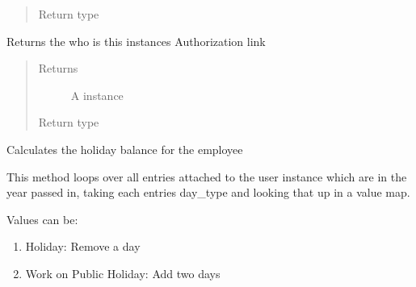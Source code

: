 \documentclass[letterpaper,10pt,english]{sphinxmanual}
\begin{document}
\begin{fulllineitems}
\begin{fulllineitems}
\begin{quote}
\begin{description}
\item[{Return type}] \leavevmode
{}

\end{description}\end{quote}

\end{fulllineitems}


\begin{fulllineitems}
\label{timetracker:timetracker.tracker.models.Tbluser.get_administrator}
Returns the {\hyperref[timetracker:timetracker.tracker.models.Tbluser]{}} who is this instances Authorization link
\begin{quote}\begin{description}
\item[{Returns}] \leavevmode
A {\hyperref[timetracker:timetracker.tracker.models.Tbluser]{}} instance

\item[{Return type}] \leavevmode
{\hyperref[timetracker:timetracker.tracker.models.Tbluser]{}}

\end{description}\end{quote}

\end{fulllineitems}


\begin{fulllineitems}
\label{timetracker:timetracker.tracker.models.Tbluser.get_holiday_balance}
Calculates the holiday balance for the employee

This method loops over all {\hyperref[timetracker:timetracker.tracker.models.TrackingEntry]{}} entries attached to
the user instance which are in the year passed in, taking each entries
day\_type and looking that up in a value map.

Values can be:
\begin{enumerate}
\item {} 
Holiday: Remove a day

\item {} 
Work on Public Holiday: Add two days


\end{enumerate}
\end{fulllineitems}
\end{fulllineitems}
\end{document}
